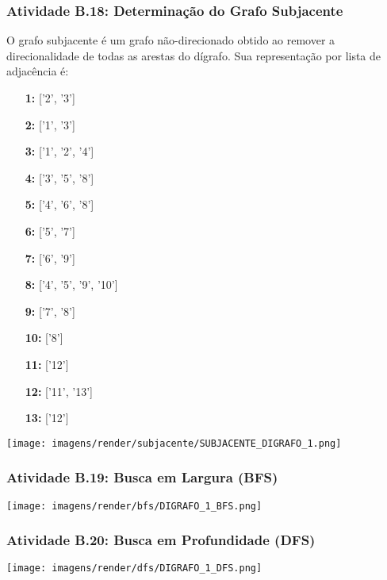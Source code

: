 \documentclass[a4paper,12pt]{article}
\begin{document}
\subsubsection*{Atividade B.18: Determinação do Grafo Subjacente}
O grafo subjacente é um grafo não-direcionado obtido ao remover a direcionalidade de todas as arestas do dígrafo. Sua representação por lista de adjacência é:
\begin{itemize}[leftmargin=*]
    \item[\textbf{1:}] ['2', '3']
    \item[\textbf{2:}] ['1', '3']
    \item[\textbf{3:}] ['1', '2', '4']
    \item[\textbf{4:}] ['3', '5', '8']
    \item[\textbf{5:}] ['4', '6', '8']
    \item[\textbf{6:}] ['5', '7']
    \item[\textbf{7:}] ['6', '9']
    \item[\textbf{8:}] ['4', '5', '9', '10']
    \item[\textbf{9:}] ['7', '8']
    \item[\textbf{10:}] ['8']
    \item[\textbf{11:}] ['12']
    \item[\textbf{12:}] ['11', '13']
    \item[\textbf{13:}] ['12']
\end{itemize}

\begin{center}
    \texttt{[image: imagens/render/subjacente/SUBJACENTE\_DIGRAFO\_1.png]}
\end{center}

\subsubsection*{Atividade B.19: Busca em Largura (BFS)}
\begin{center}
    \texttt{[image: imagens/render/bfs/DIGRAFO\_1\_BFS.png]}
\end{center}

\subsubsection*{Atividade B.20: Busca em Profundidade (DFS)}
\begin{center}
    \texttt{[image: imagens/render/dfs/DIGRAFO\_1\_DFS.png]}
\end{center}
\\
\end{document}
